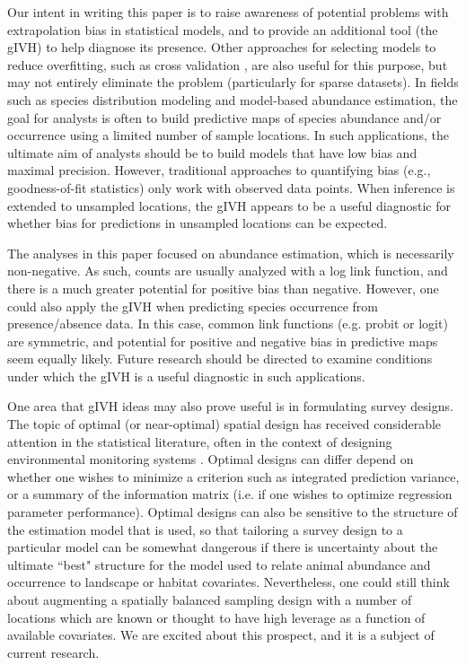 \documentclass[12pt,english]{article}
\begin{document}
\begin{spacing}{1.9}
Our intent in writing this paper is to raise awareness of potential problems with extrapolation bias in statistical models, and to provide an additional tool (the gIVH) to help diagnose its presence.  Other approaches for selecting models to reduce overfitting, such as cross validation \citep[e.g.][]{PicardCook1984}, are also useful for this purpose, but may not entirely eliminate the problem (particularly for sparse datasets). In fields such as species distribution modeling and model-based abundance estimation, the goal for analysts is often to build predictive maps of species abundance and/or occurrence using a limited number of sample locations.
In such applications, the ultimate aim of analysts should be to build models that have low bias and maximal precision.  However, traditional approaches to quantifying bias (e.g., goodness-of-fit statistics) only work with observed data points.  When inference is extended to unsampled locations, the gIVH appears to be a useful diagnostic for whether bias for predictions in unsampled locations can be expected.

The analyses in this paper focused on abundance estimation, which is necessarily non-negative.  As such, counts are usually analyzed with a log link function, and there is a much greater potential for positive bias than negative.  However, one could also apply the gIVH when predicting species occurrence from presence/absence data.  In this case, common link functions (e.g. probit or logit) are symmetric, and potential for positive and negative bias in predictive maps seem equally likely.  Future research should be directed to examine conditions under which the gIVH is a useful diagnostic in such applications.

One area that gIVH ideas may also prove useful is in formulating survey designs.  The topic of optimal (or near-optimal) spatial design has received considerable attention in the statistical literature, often in the context of designing environmental monitoring systems \citep{DiggleLophaven2006,XiaEtAl2006,Muller2007}.  Optimal designs can differ depend on whether one wishes to minimize a criterion such as integrated prediction variance, or a summary of the information matrix (i.e. if one wishes to optimize regression parameter performance).  Optimal designs can also be sensitive to the structure of the estimation model that is used, so that tailoring a survey design to a particular model can be somewhat dangerous if there is uncertainty about the ultimate ``best" structure for the model used to relate animal abundance and occurrence to landscape or habitat covariates.  Nevertheless, one could still think about augmenting a spatially balanced sampling design with a number of locations which are known or thought to have high leverage as a function of available covariates.  We are excited about this prospect, and it is a subject of current research.


\end{spacing}
\end{document}
